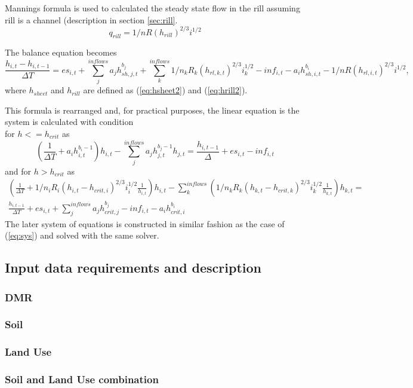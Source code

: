         Mannings formula is used to calculated the steady state flow in
        the rill assuming rill is a channel (description in section \ref{sec:rill}.  
        $$
        q_{rill} = 1/n R(h_{rill})^{2/3} i^{1/2}
        $$


        The balance equation becomes
        $$
          \frac{h_{i,t} - h_{i,t-1} }{\Delta T} = 
          es_{i,t} + \sum_j^{inflows} a_jh^{b_{j}}_{sh,j,t}  + \sum_k^{inflows} 1/n_k R_k(h_{rl,k,t})^{2/3} i_k^{1/2} - inf_{i,t} - a_ih^{b_{i}}_{sh,i,t} - 1/n R(h_{rl,i,t})^{2/3} i^{1/2},
        $$
        where $h_{sheet}$ and $h_{rill}$ are defined as (\ref{eq:hsheet2}) and  (\ref{eq:hrill2}).

        This formula is rearranged and, for practical purposes, the linear equation is the system is calculated with condition \\
        for  $h<=h_{crit}$ as
        \begin{equation}
            \left(\frac{1}{\Delta T}+a_ih^{b_{i}-1}_{i,t}\right)h_{i,t} -  \sum_j^{inflows} a_jh^{b_{j}-1}_{j,t} h_{j,t} = \frac{h_{i,t-1}}{\Delta} +  es_{i,t} - inf_{i,t}
        \end{equation}
        and for  $h>h_{crit}$ as
        \begin{multline}
          \left(\frac{1}{\Delta T}
          + 1/n_i R_i(h_{i,t}-h_{crit,i})^{2/3} i_i^{1/2} \frac{1}{h_{i,t}}\right)h_{i,t}
            - \sum_k^{inflows} \left( 1/n_k R_k(h_{k,t}-h_{crit,k})^{2/3} i_k^{1/2}  \frac{1}{h_{k,t}}\right)h_{k,t}
          =  \\
          \frac{h_{i,t-1} }{\Delta T}
          + es_{i,t} 
          + \sum_j^{inflows} a_j h^{b_{j}}_{crit,j}  
          - inf_{i,t} 
          - a_i h^{b_{i}}_{crit,i} 
        \end{multline}
    The later system of equations is constructed in similar fashion as the case of (\ref{eq:sys}) and solved with the same solver.

    \subsection{Input data requirements and description}

        
        \subsubsection{DMR}
        \subsubsection{Soil}
        \subsubsection{Land Use}
        \subsubsection{Soil and Land Use  combination}
